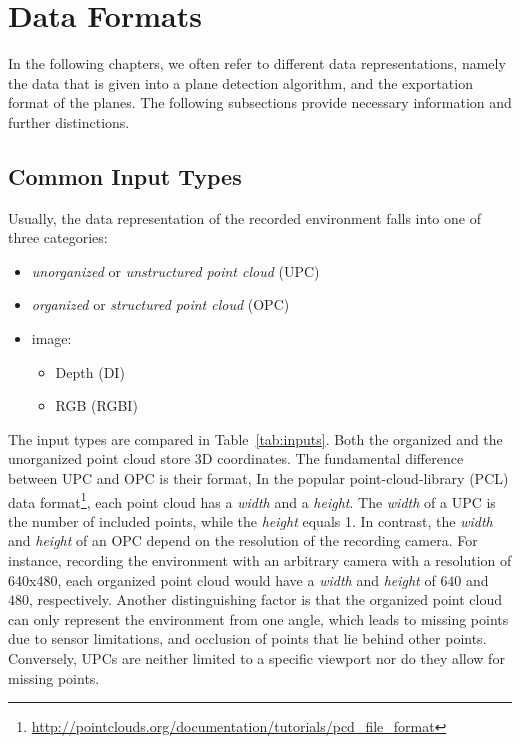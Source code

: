 \documentclass[main.tex]{subfiles}
\begin{document}
\section{Data Formats}
\label{sec:dataformats}
In the following chapters, we often refer to different data representations, namely the data that is given into a plane detection algorithm, and
the exportation format of the planes. The following subsections provide necessary information and further distinctions.


\subsection{Common Input Types}
\label{subsec:input}
Usually, the data representation of the recorded environment falls into one of three categories:
\begin{itemize}
    \item \textit{unorganized} or \textit{unstructured point cloud} (UPC)
    \item \textit{organized} or \textit{structured point cloud} (OPC)
    \item image:
          \begin{itemize}
              \item Depth (DI)
              \item RGB (RGBI)
          \end{itemize}
\end{itemize}

The input types are compared in Table~\ref{tab:inputs}. Both the organized and the unorganized point cloud store 3D coordinates.
The fundamental difference between UPC and OPC is their format,
In the popular point-cloud-library (PCL) data format\footnote{\href{http://pointclouds.org/documentation/tutorials/pcd\_file\_format}{http://pointclouds.org/documentation/tutorials/pcd\_file\_format}}, 
each point cloud has a \textit{width} and a \textit{height}.
The \textit{width} of a UPC is the number of included points, while the \textit{height} equals 1.
In contrast, the \textit{width} and \textit{height} of an OPC depend on the resolution of the recording camera.
For instance, recording the environment with an arbitrary camera with a resolution of 640x480, each organized point cloud 
would have a \textit{width} and \textit{height} of $640$ and $480$, respectively. Another distinguishing factor is that the organized
point cloud can only represent the environment from one angle, which leads to missing points due to sensor limitations, and occlusion
of points that lie behind other points. Conversely, UPCs are neither limited to a specific viewport nor do they allow for missing points. 
\end{document}
